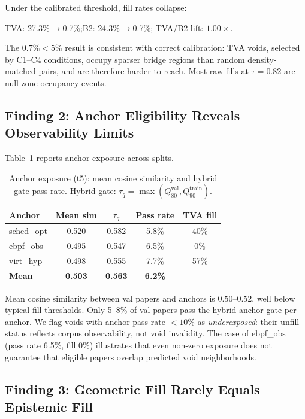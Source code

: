 \documentclass[sigconf]{acmart}
\newcommand{\tva}{\textsf{TVA}}
\newcommand{\tauanchor}{\tau_{q}}
\begin{document}
Under the calibrated threshold, fill rates collapse:
\begin{center}
\tva{}: 27.3\%$\to$0.7\%;\quad B2: 24.3\%$\to$0.7\%;\quad
\tva{}/B2 lift: $1.00\times$.
\end{center}
The $0.7\% < 5\%$ result is consistent with correct calibration:
\tva{} voids, selected by C1--C4 conditions, occupy sparser bridge regions than random
density-matched pairs, and are therefore harder to reach.
Most raw fills at $\tau=0.82$ are null-zone occupancy events.

\subsection{Finding 2: Anchor Eligibility Reveals Observability Limits}
\label{sec:finding2}

Table~\ref{tab:exposure} reports anchor exposure across splits.

\begin{table}[h]
\centering
\caption{Anchor exposure (t5): mean cosine similarity and hybrid gate pass rate.
Hybrid gate: $\tauanchor = \max(Q_{80}^{\mathrm{val}}, Q_{90}^{\mathrm{train}})$.}
\label{tab:exposure}
\begin{tabular}{lcccc}
\toprule
Anchor & Mean sim & $\tauanchor$ & Pass rate & \tva{} fill \\
\midrule
sched\_opt & 0.520 & 0.582 & 5.8\% & 40\% \\
ebpf\_obs  & 0.495 & 0.547 & 6.5\% & 0\% \\
virt\_hyp  & 0.498 & 0.555 & 7.7\% & 57\% \\
\textbf{Mean} & \textbf{0.503} & \textbf{0.563} & \textbf{6.2\%} & -- \\
\bottomrule
\end{tabular}
\end{table}

Mean cosine similarity between val papers and anchors is $0.50$--$0.52$, well below typical
fill thresholds.
Only 5--8\% of val papers pass the hybrid anchor gate per anchor.
We flag voids with anchor pass rate $< 10\%$ as \emph{underexposed}: their unfill
status reflects corpus observability, not void invalidity.
The case of ebpf\_obs (pass rate 6.5\%, fill 0\%) illustrates that even non-zero
exposure does not guarantee that eligible papers overlap predicted void neighborhoods.

\subsection{Finding 3: Geometric Fill Rarely Equals Epistemic Fill}
\label{sec:finding3}
\end{document}
